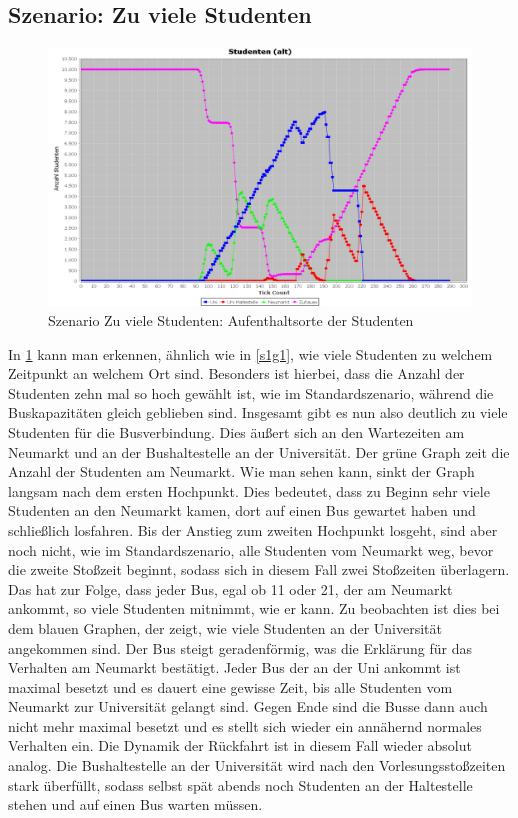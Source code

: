 \documentclass[12pt,a4paper]{scrartcl}
\begin{document}
\subsection{Szenario: Zu viele Studenten}\label{s2}

\begin{figure}
\includegraphics[scale=0.4]{Viele_Studenten_Aufenthaltsorte.png}
\caption{Szenario \glqq Zu viele Studenten\grqq : Aufenthaltsorte der Studenten}
\label{s2g1}
\end{figure}

In \ref{s2g1} kann man erkennen, ähnlich wie in \ref{s1g1}, wie viele Studenten zu welchem Zeitpunkt an welchem Ort sind. Besonders ist hierbei, dass die Anzahl der Studenten zehn mal so hoch gewählt ist, wie im Standardszenario, während die Buskapazitäten gleich geblieben sind. Insgesamt gibt es nun also deutlich zu viele Studenten für die Busverbindung. Dies äußert sich an den Wartezeiten am Neumarkt und an der Bushaltestelle an der Universität.
Der grüne Graph zeit die Anzahl der Studenten am Neumarkt. Wie man sehen kann, sinkt der Graph langsam nach dem ersten Hochpunkt. Dies bedeutet, dass zu Beginn sehr viele Studenten an den Neumarkt kamen, dort auf einen Bus gewartet haben und schließlich losfahren. Bis der Anstieg zum zweiten Hochpunkt losgeht, sind aber noch nicht, wie im Standardszenario, alle Studenten vom Neumarkt weg, bevor die zweite Stoßzeit beginnt, sodass sich in diesem Fall zwei Stoßzeiten überlagern. Das hat zur Folge, dass jeder Bus, egal ob 11 oder 21, der am Neumarkt ankommt, so viele Studenten mitnimmt, wie er kann. Zu beobachten ist dies bei dem blauen Graphen, der zeigt, wie viele Studenten an der Universität angekommen sind. Der Bus steigt geradenförmig, was die Erklärung für das Verhalten am Neumarkt bestätigt. Jeder Bus der an der Uni ankommt ist maximal besetzt und es dauert eine gewisse Zeit, bis alle Studenten vom Neumarkt zur Universität gelangt sind. Gegen Ende sind die Busse dann auch nicht mehr maximal besetzt und es stellt sich wieder ein annähernd normales Verhalten ein. 
Die Dynamik der Rückfahrt ist in diesem Fall wieder absolut analog. Die Bushaltestelle an der Universität wird nach den Vorlesungsstoßzeiten stark überfüllt, sodass selbst spät abends noch Studenten an der Haltestelle stehen und auf einen Bus warten müssen. 
\end{document}
